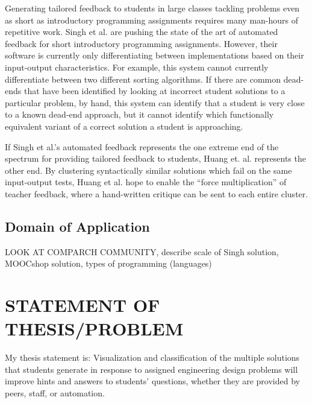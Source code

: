 \documentclass[12pt]{article}
\begin{document}
Generating tailored feedback to students in large classes tackling problems even as short as introductory programming assignments requires many man-hours of repetitive work. Singh et al. \cite{rishabh} are pushing the state of the art of automated feedback for short introductory programming assignments. However, their software is currently only differentiating between implementations based on their input-output characteristics. For example, this system cannot currently differentiate between two different sorting algorithms. If there are common dead-ends that have been identified by looking at incorrect student solutions to a particular problem, by hand, this system can identify that a student is very close to a known dead-end approach, but it cannot identify which functionally equivalent variant of a correct solution a student is approaching. 

If Singh et al.'s automated feedback represents the one extreme end of the spectrum for providing tailored feedback to students, Huang et. al. \cite{MOOCshop} represents the other end. By clustering syntactically similar solutions which fail on the same input-output tests, Huang et al. hope to enable the ``force multiplication'' of teacher feedback, where a hand-written critique can be sent to each entire cluster.

\subsection{Domain of Application}

LOOK AT COMPARCH COMMUNITY, describe scale of Singh solution, MOOCshop solution, types of programming (languages)

\section{STATEMENT OF THESIS/PROBLEM}

My thesis statement is: Visualization and classification of the multiple solutions that students generate in response to assigned engineering design problems will improve hints and answers to students' questions, whether they are provided by peers, staff, or automation. 
\end{document}

